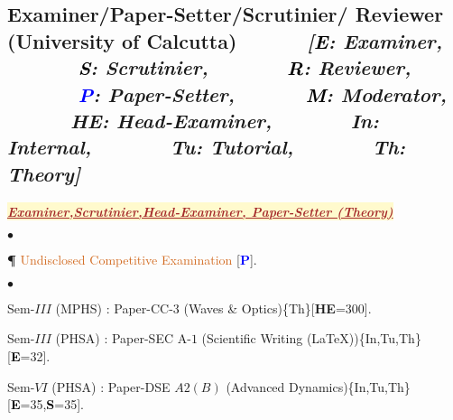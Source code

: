 \documentclass[margin,line]{res}
\newenvironment{list1}{
  \begin{list}{\ding{113}}{%
      \setlength{\itemsep}{0in}
      \setlength{\parsep}{0in} \setlength{\parskip}{0in}
      \setlength{\topsep}{0in} \setlength{\partopsep}{0in} 
      \setlength{\leftmargin}{0.17in}}}{\end{list}}
\newenvironment{list2}{
  \begin{list}{$\bullet$}{%
      \setlength{\itemsep}{0in}
      \setlength{\parsep}{0in} \setlength{\parskip}{0in}
      \setlength{\topsep}{0in} \setlength{\partopsep}{0in} 
      \setlength{\leftmargin}{0.2in}}}{\end{list}}
\begin{document}
\begin{resume}
\section{\sc Examiner/Paper-Setter/Scrutinier/ Reviewer (University of Calcutta) $\;\;\;\;\;\;\;\;\;\;\;\;${\it [\textcolor{black}{\bf E}: Examiner, $\;\;\;\;\;\;\;\;\;\;\;\;$ \textcolor{black}{\bf S}: Scrutinier, $\;\;\;\;\;\;\;\;\;\;\;\;$ \textcolor{black}{\bf R}: Reviewer, $\;\;\;\;\;\;\;\;\;\;\;\;$ \textcolor{blue}{\bf P}: Paper-Setter, $\;\;\;\;\;\;\;\;\;\;\;\;$\textcolor{black}{\bf M}: Moderator, $\;\;\;\;\;\;\;\;\;\;\;\;$\textcolor{asparagus}{\bf HE}: Head-Examiner, $\;\;\;\;\;\;\;\;\;\;\;\;$ \textcolor{alizarin}{\bf In}: Internal, $\;\;\;\;\;\;\;\;\;\;\;\;$ \textcolor{alizarin}{\bf Tu}: Tutorial, $\;\;\;\;\;\;\;\;\;\;\;\;$ \textcolor{alizarin}{\bf Th}: Theory]}}
\begin{list1}
\item[] \colorbox{lemonchiffon}{\textcolor{brown}{\underline{\textbf{\textit{Examiner,Scrutinier,Head-Examiner, Paper-Setter (Theory)}}}}}
\vspace{1mm}
\end{list1}
\begin{list1}
\item[] \textcolor{iris}{}
\vspace{1mm}
\end{list1}
\begin{list2}
\item[{\bf \P}] \textcolor{chocolate}{Undisclosed Competitive Examination} [\textcolor{blue}{\bf P}]. 
\end{list2}
\begin{list1}
\item[] \textcolor{iris}{}
\vspace{1mm}
\end{list1}
\begin{list2}
\item Sem-$III$ (MPHS) : Paper-CC-$3$ (Waves \& Optics)\textcolor{alizarin}{\{Th\}}[\textcolor{asparagus}{\bf HE}=300]. 
\item Sem-$III$ (PHSA) : Paper-SEC A-$1$ (Scientific Writing (\LaTeX))\textcolor{alizarin}{\{In,Tu,Th\}}[\textcolor{black}{\bf E}=32]. 
\item Sem-$VI$ (PHSA) : Paper-DSE $A2(B)$ (Advanced Dynamics)\textcolor{alizarin}{\{In,Tu,Th\}}[\textcolor{black}{\bf E}=35,\textcolor{black}{\bf S}=35].
\end{list2}
\begin{list1}

\end{list1}
\end{resume}
\end{document}
